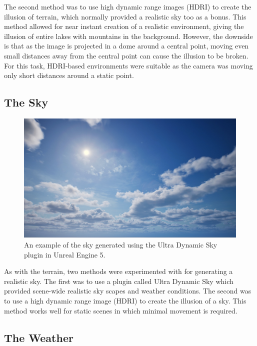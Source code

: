 \documentclass[10pt,twocolumn,letterpaper]{article}
\begin{document}
The second method was to use high dynamic range images (HDRI) to create the illusion of terrain, which normally provided a realistic sky too as a bonus. This method allowed for near instant creation of a realistic environment, giving the illusion of entire lakes with mountains in the background. However, the downside is that as the image is projected in a dome around a central point, moving even small distances away from the central point can cause the illusion to be broken. For this task, HDRI-based environments were suitable as the camera was moving only short distances around a static point.

\subsection{The Sky}

\begin{figure}[t]
    \centering
    \includegraphics[width=\linewidth]{images/ultra_dynamic_sky.png}
    \caption{An example of the sky generated using the Ultra Dynamic Sky plugin in Unreal Engine 5.}
    \label{fig:sky_example}
\end{figure}

As with the terrain, two methods were experimented with for generating a realistic sky. The first was to use a plugin called Ultra Dynamic Sky \cite{UltraDynamicSky} which provided scene-wide realistic sky scapes and weather conditions. The second was to use a high dynamic range image (HDRI) to create the illusion of a sky. This method works well for static scenes in which minimal movement is required.

\subsection{The Weather}
\end{document}
